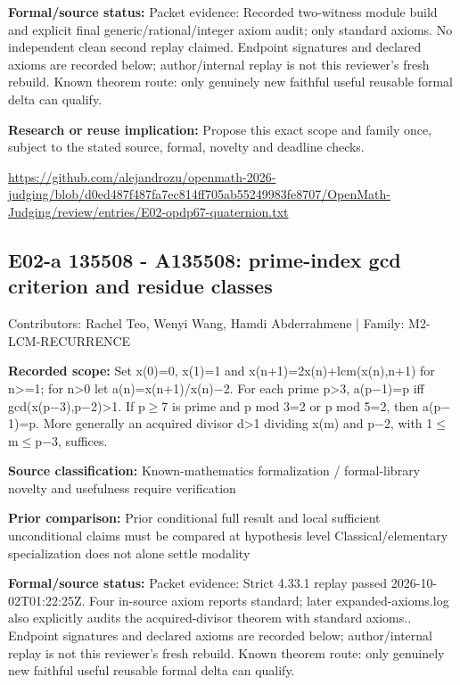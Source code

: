 \documentclass[11pt,a4paper]{article}
\begin{document}
\textbf{Formal/source status:} Packet evidence: Recorded two-witness module build and explicit final generic/rational/integer axiom audit; only standard axioms. No independent clean second replay claimed. Endpoint signatures and declared axioms are recorded below; author/internal replay is not this reviewer's fresh rebuild. Known theorem route: only genuinely new faithful useful reusable formal delta can qualify.

\textbf{Research or reuse implication:} Propose this exact scope and family once, subject to the stated source, formal, novelty and deadline checks.

{\small \url{https://github.com/alejandrozu/openmath-2026-judging/blob/d0ed487f487fa7ec814ff705ab55249983fe8707/OpenMath-Judging/review/entries/E02-opdp67-quaternion.txt}\par}

\begin{samepage}
\subsection{E02-a 135508  -  A135508: prime-index gcd criterion and residue classes}
{\small Contributors: Rachel Teo, Wenyi Wang, Hamdi Abderrahmene | Family: M2-LCM-RECURRENCE\par}

\textbf{Recorded scope:} Set x(0)=0, x(1)=1 and x(n+1)=2x(n)+lcm(x(n),n+1) for n>=1; for n>0 let a(n)=x(n+1)/x(n)\ensuremath{-}2. For each prime p>3, a(p\ensuremath{-}1)=p iff gcd(x(p\ensuremath{-}3),p\ensuremath{-}2)>1. If p\ensuremath{\geq}7 is prime and p mod 3=2 or p mod 5=2, then a(p\ensuremath{-}1)=p. More generally an acquired divisor d>1 dividing x(m) and p\ensuremath{-}2, with 1\ensuremath{\leq}m\ensuremath{\leq}p\ensuremath{-}3, suffices.

\end{samepage}
\textbf{Source classification:} Known-mathematics formalization / formal-library novelty and usefulness require verification

\textbf{Prior comparison:} Prior conditional full result and local sufficient unconditional claims must be compared at hypothesis level Classical/elementary specialization does not alone settle modality

\textbf{Formal/source status:} Packet evidence: Strict 4.33.1 replay passed 2026-10-02T01:22:25Z. Four in-source axiom reports standard; later expanded-axioms.log also explicitly audits the acquired-divisor theorem with standard axioms.. Endpoint signatures and declared axioms are recorded below; author/internal replay is not this reviewer's fresh rebuild. Known theorem route: only genuinely new faithful useful reusable formal delta can qualify.
\end{document}
